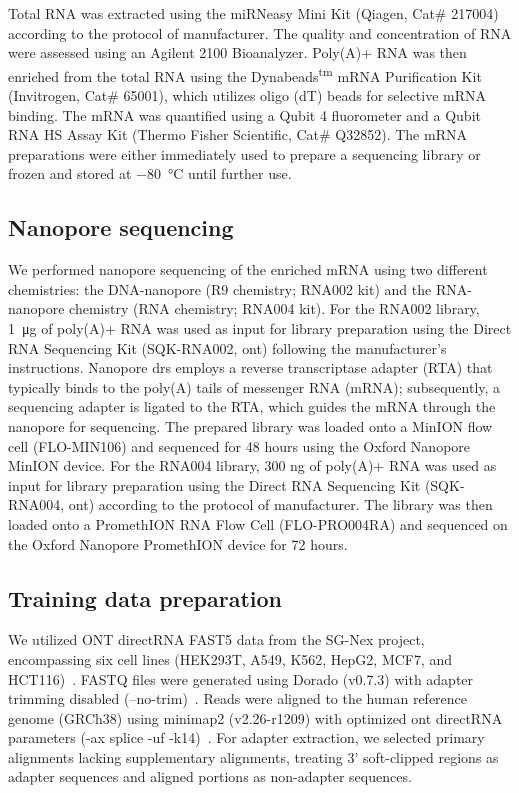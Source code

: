 \documentclass[pdflatex, sn-mathphys-num, lineno]{sn-jnl}%
\theoremstyle{thmstyleone}%
\theoremstyle{thmstyletwo}%
\theoremstyle{thmstylethree}%
\begin{document}
Total RNA was extracted using the miRNeasy Mini Kit (Qiagen, Cat\# 217004) according to the protocol of manufacturer.
The quality and concentration of RNA were assessed using an Agilent 2100 Bioanalyzer.
Poly(A)+ RNA was then enriched from the total RNA using the Dynabeads\textsuperscript{tm} mRNA Purification Kit (Invitrogen, Cat\# 65001), which utilizes oligo (dT) beads for selective mRNA binding.
The mRNA was quantified using a Qubit 4 fluorometer and a Qubit RNA HS Assay Kit (Thermo Fisher Scientific, Cat\# Q32852).
The mRNA preparations were either immediately used to prepare a sequencing library or frozen and stored at \SI{-80}{\degreeCelsius} until further use.

\subsection{Nanopore sequencing}

We performed nanopore sequencing of the enriched mRNA using two different chemistries: the DNA-nanopore (R9 chemistry; RNA002 kit) and the RNA-nanopore chemistry (RNA chemistry; RNA004 kit).
For the RNA002 library, \SI{1}{\micro\gram} of poly(A)+ RNA was used as input for library preparation using the Direct RNA Sequencing Kit (SQK-RNA002, \gls{ont}) following the manufacturer's instructions.
Nanopore \gls{drs} employs a reverse transcriptase adapter (RTA) that typically binds to the poly(A) tails of messenger RNA (mRNA); subsequently, a sequencing adapter is ligated to the RTA, which guides the mRNA through the nanopore for sequencing.
The prepared library was loaded onto a MinION flow cell (FLO-MIN106) and sequenced for 48 hours using the Oxford Nanopore MinION device.
For the RNA004 library, 300 ng of poly(A)+ RNA was used as input for library preparation using the Direct RNA Sequencing Kit (SQK-RNA004, \gls{ont}) according to the protocol of manufacturer.
The library was then loaded onto a PromethION RNA Flow Cell (FLO-PRO004RA) and sequenced on the Oxford Nanopore PromethION device for 72 hours.

\subsection{Training data preparation}\label{ssec:data}

We utilized ONT directRNA FAST5 data from the SG-Nex project, encompassing six cell lines (HEK293T, A549, K562, HepG2, MCF7, and HCT116)~\cite{chen2021systematic}.
FASTQ files were generated using Dorado (v0.7.3) with adapter trimming disabled (--no-trim)~\cite{dorado2023}.
Reads were aligned to the human reference genome (GRCh38) using minimap2 (v2.26-r1209) with optimized \gls{ont} directRNA parameters (-ax splice -uf -k14)~\cite{li2018minimap2}.
For adapter extraction, we selected primary alignments lacking supplementary alignments, treating 3' soft-clipped regions as adapter sequences and aligned portions as non-adapter sequences.
\end{document}
